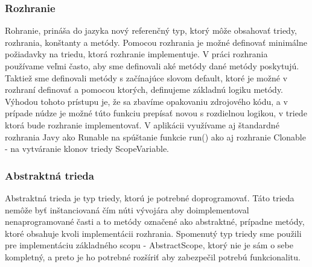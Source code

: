 \subsubsection{Rozhranie}
\indent Rohranie, prináša do jazyka nový referenčný typ, ktorý môže obsahovať triedy, rozhrania, konštanty a metódy. Pomocou rozhrania je možné definovať minimálne požiadavky na triedu, ktorá rozhranie implementuje. \cite{javabook} V práci rozhrania používame veľmi často, aby sme definovali aké metódy dané metódy poskytujú.  Taktiež sme definovali metódy s začínajúce slovom default, ktoré je možné v rozhraní definovať a pomocou ktorých, definujeme základnú logiku metódy. Výhodou tohoto prístupu je, že sa zbavíme opakovaniu zdrojového kódu, a v prípade núdze je možné túto funkciu prepísať novou s rozdielnou logikou, v triede ktorá bude rozhranie implementovať. V aplikácii využívame aj štandardné rozhrania Javy ako Runable na spúštanie funkcie run() ako aj rozhranie Clonable - na vytváranie klonov triedy ScopeVariable.

\subsubsection{Abstraktná trieda}
\indent Abstraktná trieda je typ triedy, ktorú je potrebné doprogramovať. Táto trieda nemôže byť inštanciovaná čím núti vývojára aby doimplementoval nenaprogramované časti a to metódy označené ako abstraktné, prípadne metódy, ktoré obsahuje kvoli implementácii rozhrania. \cite{javabook}  Spomenutý typ triedy sme použili pre implementáciu základného scopu - AbstractScope, ktorý nie je sám o sebe kompletný, a preto je ho potrebné rozšíriť aby zabezpečil potrebú funkcionalitu.

